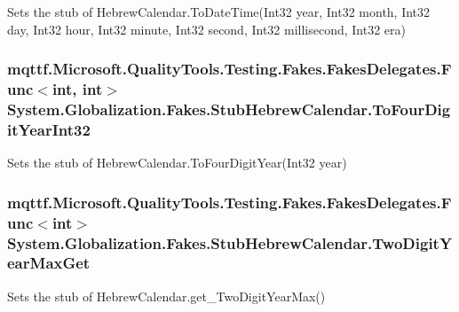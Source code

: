 Sets the stub of Hebrew\-Calendar.\-To\-Date\-Time(\-Int32 year, Int32 month, Int32 day, Int32 hour, Int32 minute, Int32 second, Int32 millisecond, Int32 era)

\hypertarget{class_system_1_1_globalization_1_1_fakes_1_1_stub_hebrew_calendar_a58df4569917e5f68485dbcb57b6d1b0c}{
\subsubsection[{To\-Four\-Digit\-Year\-Int32}]{\setlength{\rightskip}{0pt plus 5cm}mqttf.\-Microsoft.\-Quality\-Tools.\-Testing.\-Fakes.\-Fakes\-Delegates.\-Func$<$int, int$>$ System.\-Globalization.\-Fakes.\-Stub\-Hebrew\-Calendar.\-To\-Four\-Digit\-Year\-Int32}}\label{class_system_1_1_globalization_1_1_fakes_1_1_stub_hebrew_calendar_a58df4569917e5f68485dbcb57b6d1b0c}


Sets the stub of Hebrew\-Calendar.\-To\-Four\-Digit\-Year(\-Int32 year)

\hypertarget{class_system_1_1_globalization_1_1_fakes_1_1_stub_hebrew_calendar_a9245541bff4df043e7a0a83e60d43a63}{
\subsubsection[{Two\-Digit\-Year\-Max\-Get}]{\setlength{\rightskip}{0pt plus 5cm}mqttf.\-Microsoft.\-Quality\-Tools.\-Testing.\-Fakes.\-Fakes\-Delegates.\-Func$<$int$>$ System.\-Globalization.\-Fakes.\-Stub\-Hebrew\-Calendar.\-Two\-Digit\-Year\-Max\-Get}}\label{class_system_1_1_globalization_1_1_fakes_1_1_stub_hebrew_calendar_a9245541bff4df043e7a0a83e60d43a63}


Sets the stub of Hebrew\-Calendar.\-get\-\_\-\-Two\-Digit\-Year\-Max()

